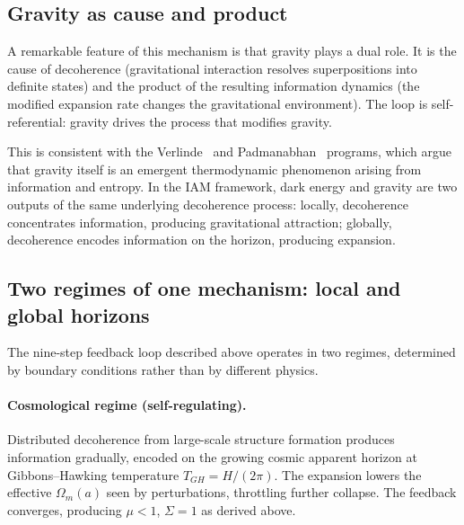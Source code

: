 \subsection{Gravity as cause and product}
A remarkable feature of this mechanism is that gravity plays a dual role. It is the cause of decoherence (gravitational interaction resolves
superpositions into definite states) and the product of the resulting information dynamics (the modified expansion rate changes the gravitational
environment). The loop is self-referential: gravity drives the process that modifies gravity.

This is consistent with the Verlinde~\cite{Verlinde2011} and Padmanabhan~\cite{Padmanabhan2010} programs, which argue that gravity itself is an emergent
thermodynamic phenomenon arising from information and entropy. In the IAM framework, dark energy and gravity are two outputs of the same underlying
decoherence process: locally, decoherence concentrates information, producing gravitational attraction; globally, decoherence encodes information on
the horizon, producing expansion. \interp

\subsection{Two regimes of one mechanism: local and global horizons}
The nine-step feedback loop described above operates in two regimes, determined by boundary conditions rather than by different physics.

\paragraph{Cosmological regime (self-regulating).} Distributed decoherence from large-scale structure formation produces information gradually, encoded
on the growing cosmic apparent horizon at Gibbons--Hawking temperature $T_{GH}=H/(2\pi)$. The expansion lowers the effective $\Omega_m(a)$ seen by
perturbations, throttling further collapse. The feedback converges, producing $\mu<1$, $\Sigma=1$ as derived above.

